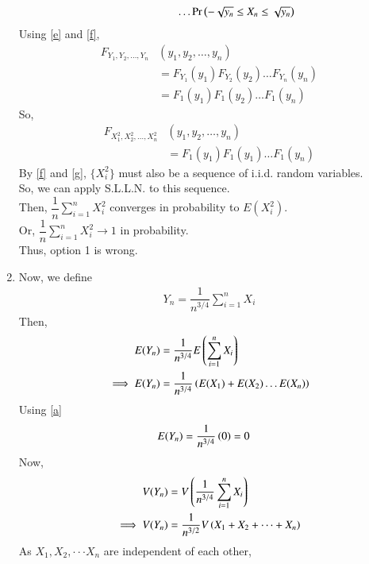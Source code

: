 \documentclass[journal,12pt,twocolumn]{IEEEtran}
\begin{document}
\begin{enumerate}
\begin{align}
            &\hspace{2cm} \dots \Pr\left(-\sqrt{y_n} \leq X_n \leq \sqrt{y_n}\right)
        \end{align}
        Using \eqref{e} and \eqref{f},
        \begin{align}
            F_{Y_1,Y_2,\dots,Y_n}&(y_1,y_2,\dots,y_n) \nonumber \\
            &=F_{Y_1}(y_1) F_{Y_2}(y_2)\dots F_{Y_n}(y_n)\\
            &=F_1(y_1) F_1(y_2) \dots F_1(y_n)
        \end{align}
        So,
        \begin{align} \label{g}
            F_{X_1^2,X_2^2,\dots,X_n^2}&(y_1,y_2,\dots,y_n)\nonumber \\
            &=F_1(y_1) F_1(y_1)\dots F_1(y_n)
        \end{align}
        By \eqref{f} and \eqref{g}, $\{X_i^2\}$ must also be a sequence of i.i.d. random variables.\\
        So, we can apply S.L.L.N. to this sequence.\\
        Then, $\dfrac{1}{n}\sum_{i=1}^nX_i^2$ converges in probability to $E(X_i^2)$.\\
        Or, $\dfrac{1}{n}\sum_{i=1}^nX_i^2 \to 1$ in probability.\\
        Thus, option 1 is wrong.
    \item
        Now, we define
        \begin{align}
            Y_n=\dfrac{1}{n^{3/4}}\sum_{i=1}^nX_i
        \end{align}
        Then,
        \begin{align}
            E(Y_n) &= \dfrac{1}{n^{3/4}}E\left(\sum_{i=1}^nX_i\right) \\
            \implies E(Y_n) &= \dfrac{1}{n^{3/4}}\left(E(X_1)+E(X_2) \dots E(X_n)\right)
        \end{align}
        Using \eqref{a}
        \begin{align}
            E(Y_n) &= \dfrac{1}{n^{3/4}}\left(0\right) =0
        \end{align}
        Now,
        \begin{align}
            V(Y_n) &= V\left(\dfrac{1}{n^{3/4}}\sum_{i=1}^nX_i\right) \\
            \implies V(Y_n) &= \dfrac{1}{n^{3/2}}V\left(X_1+X_2+ \dots +X_n\right)
        \end{align}
        As $X_1, X_2, \cdot \cdot \cdot X_n$ are independent of each other,
        \begin{align}

\end{align}
\end{enumerate}
\end{document}
